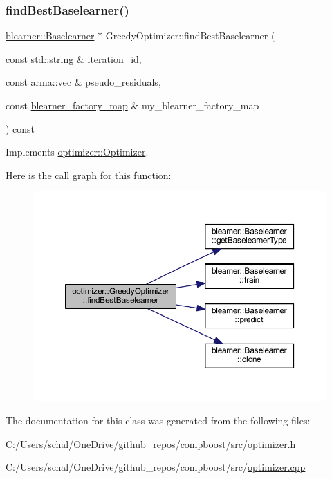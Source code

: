 \subsubsection{\texorpdfstring{find\+Best\+Baselearner()}{findBestBaselearner()}}
{\footnotesize\ttfamily \mbox{\hyperlink{classblearner_1_1_baselearner}{blearner\+::\+Baselearner}} $\ast$ Greedy\+Optimizer\+::find\+Best\+Baselearner (\begin{DoxyParamCaption}\item[{const std\+::string \&}]{iteration\+\_\+id,  }\item[{const arma\+::vec \&}]{pseudo\+\_\+residuals,  }\item[{const \mbox{\hyperlink{baselearner__factory__list_8h_a058570e00ae11b882cfed36eb40be025}{blearner\+\_\+factory\+\_\+map}} \&}]{my\+\_\+blearner\+\_\+factory\+\_\+map }\end{DoxyParamCaption}) const\hspace{0.3cm}{\ttfamily [virtual]}}



Implements \mbox{\hyperlink{classoptimizer_1_1_optimizer_a134c7b34ed868231fbab53e9ebfa8fd8}{optimizer\+::\+Optimizer}}.

Here is the call graph for this function\+:\nopagebreak
\begin{figure}[H]
\begin{center}
\leavevmode
\includegraphics[width=350pt]{classoptimizer_1_1_greedy_optimizer_a5551f9dd7135e3a4acc68ac585be3146_cgraph}
\end{center}
\end{figure}


The documentation for this class was generated from the following files\+:\begin{DoxyCompactItemize}
\item 
C\+:/\+Users/schal/\+One\+Drive/github\+\_\+repos/compboost/src/\mbox{\hyperlink{optimizer_8h}{optimizer.\+h}}\item 
C\+:/\+Users/schal/\+One\+Drive/github\+\_\+repos/compboost/src/\mbox{\hyperlink{optimizer_8cpp}{optimizer.\+cpp}}\end{DoxyCompactItemize}
